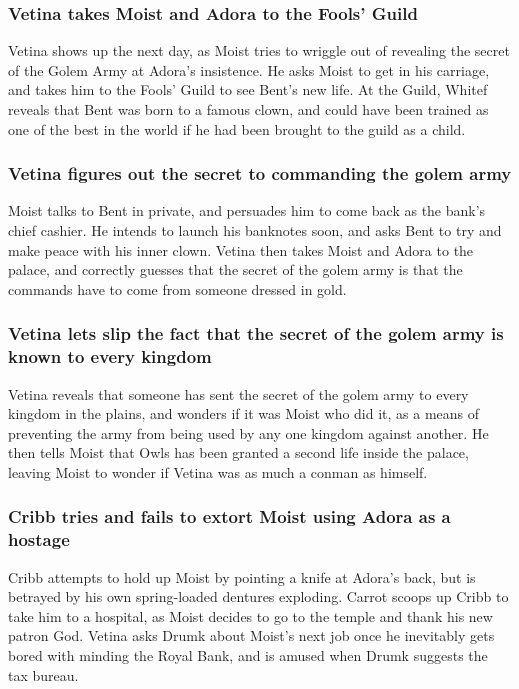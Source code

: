 \subsubsection{\Gls{Vetina} takes \Gls{Moist} and \Gls{Adora} to the Fools' Guild}
\Gls{Vetina} shows up the next day, as \Gls{Moist} tries to wriggle out of revealing the secret of
the Golem Army at \Gls{Adora}'s insistence. He asks \Gls{Moist} to get in his carriage, and takes
him to the Fools' Guild to see \Gls{Bent}'s new life. At the Guild, \Gls{Whitef} reveals that
\Gls{Bent} was born to a famous clown, and could have been trained as one of the best in the world
if he had been brought to the guild as a child.

\subsubsection{\Gls{Vetina} figures out the secret to commanding the golem army}
\Gls{Moist} talks to \Gls{Bent} in private, and persuades him to come back as the bank's chief
cashier. He intends to launch his banknotes soon, and asks \Gls{Bent} to try and make peace with his
inner clown. \Gls{Vetina} then takes \Gls{Moist} and \Gls{Adora} to the palace, and correctly
guesses that the secret of the golem army is that the commands have to come from someone dressed in
gold.

\subsubsection{\Gls{Vetina} lets slip the fact that the secret of the golem army is known to
    every kingdom}
\Gls{Vetina} reveals that someone has sent the secret of the golem army to every kingdom in the
plains, and wonders if it was \Gls{Moist} who did it, as a means of preventing the army from being
used by any one kingdom against another. He then tells \Gls{Moist} that \Gls{Owls} has been granted
a second life inside the palace, leaving \Gls{Moist} to wonder if \Gls{Vetina} was as much a
conman as himself.

\subsubsection{\Gls{Cribb} tries and fails to extort \Gls{Moist} using \Gls{Adora} as a hostage}
\Gls{Cribb} attempts to hold up \Gls{Moist} by pointing a knife at \Gls{Adora}'s back, but is
betrayed by his own spring-loaded dentures exploding. \Gls{Carrot} scoops up \Gls{Cribb} to take
him to a hospital, as \Gls{Moist} decides to go to the temple and thank his new patron God.
\Gls{Vetina} asks \Gls{Drumk} about \Gls{Moist}'s next job once he inevitably gets bored with
minding the Royal Bank, and is amused when \Gls{Drumk} suggests the tax bureau.

